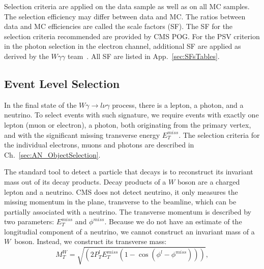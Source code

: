 Selection criteria are applied on the data sample as well as on all MC samples. The selection efficiency may differ between data and MC. The ratios between data and MC efficiencies are called the scale factors (SF). The SF for the selection criteria recommended are provided by CMS POG. For the PSV criterion in the photon selection in the electron channel, additional SF are applied as derived by the $W\gamma\gamma$ team~\cite{ref_Wgg8TeV}. All SF are listed in App.~\ref{sec:SFsTables}.

\subsection{Event Level Selection}
\label{sec:AN_Selection_EventLevel}

In the final state of the $W\gamma\rightarrow l\nu\gamma$ process, there is a lepton, a photon, and a neutrino. To select events with such signature, we require events with exactly one lepton (muon or electron), a photon, both originating from the primary vertex, and with the significant missing transverse energy $E_T^{miss}$. The selection criteria for the individual electrons, muons and photons are described in Ch.~\ref{sec:AN_ObjectSelection}.

The standard tool to detect a particle that decays is to reconstruct its invariant mass out of its decay products. Decay products of a $W$ boson are a charged lepton and a neutrino. CMS does not detect neutrino, it only measures the missing momentum in the plane, transverse to the beamline, which can be partially associated with a neutrino. The transverse momentum is described by two parameters: $E_T^{miss}$ and $\phi^{miss}$. Because we do not have an estimate of the longitudial component of a neutrino, we cannot construct an invariant mass of a $W$~boson. Instead, we construct its transverse mass:
\begin{equation}
M_T^W=\sqrt{(2  P_T^{l}  E_T^{miss}  (1-\cos{(\phi^{l}-\phi^{miss})}))},
\end{equation}

